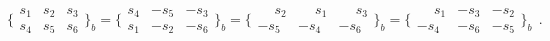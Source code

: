 \begin{equation}\label{tetr}
\big\{\begin{smallmatrix}
s_1 & s_2 & s_3 \\ s_4 & s_5 & s_6 \end{smallmatrix}\big\}_b^{}
=\big\{\begin{smallmatrix}
s_4 & -s_5 & -s_3 \\ s_1 & -s_2 & -s_6 \end{smallmatrix}\big\}_b^{}
=\big\{\begin{smallmatrix}\phantom{-}
s_2 & \phantom{-}s_1 & \phantom{-}s_3 \\ 
-s_5 & -s_4 & -s_6 \end{smallmatrix}\big\}_b^{}
=\big\{\begin{smallmatrix}
\phantom{-}s_1 & -s_3 & -s_2 \\ 
-s_4 & -s_6 & -s_5 \end{smallmatrix}\big\}_b^{}\;\, .
\end{equation}

